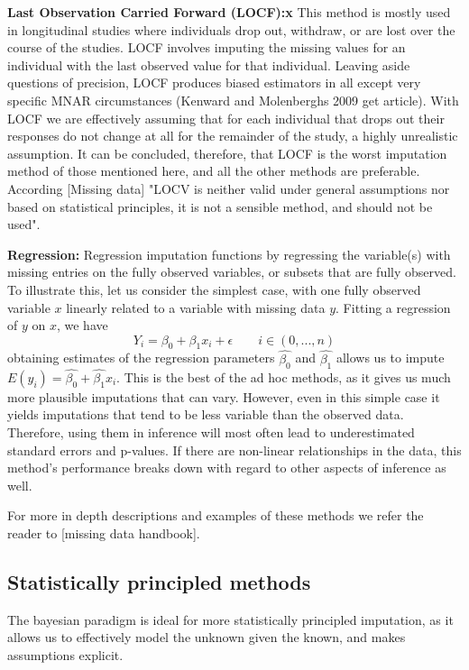 \documentclass{article}
\begin{document}
	
	\textbf{Last Observation Carried Forward (LOCF):x}
	This method is mostly used in longitudinal studies where individuals drop out, withdraw, or are lost over the course of the studies. LOCF involves imputing the missing values for an individual with the last observed value for that individual. Leaving aside questions of precision, LOCF produces biased estimators in all except very specific MNAR circumstances (Kenward and Molenberghs 2009 get article). With LOCF we are effectively assuming that for each individual that drops out their responses do not change at all for the remainder of the study, a highly unrealistic assumption. It can be concluded, therefore, that LOCF is the worst imputation method of those mentioned here, and all the other methods are preferable. According [Missing data] "LOCV is neither valid under general assumptions nor based on statistical principles, it is not a sensible method, and should not be used".
	
	\textbf{Regression:}
	Regression imputation functions by regressing the variable(s) with missing entries on the fully observed variables, or subsets that are fully observed. To illustrate this, let us consider the simplest case, with one fully observed variable $x$ linearly related to a variable with missing data $y$. Fitting a regression of $y$ on $x$, we have$$Y_{i} = \beta_{0} + \beta_{1}x_{i} + \epsilon \qquad i\in(0,...,n)$$ obtaining estimates of the regression parameters $\hat{\beta_{0}}$ and $\hat{\beta_{1}}$ allows us to impute $E(y_{i}) = \hat{\beta_{0}} + \hat{\beta_{1}}x_{i}$. This is the best of the ad hoc methods, as it gives us much more plausible imputations that can vary. However, even in this simple case it yields imputations that tend to be less variable than the observed data. Therefore, using them in inference will most often lead to underestimated standard errors and p-values. If there are non-linear relationships in the data, this method's performance breaks down with regard to other aspects of inference as well.
	
	For more in depth descriptions and examples of these methods we refer the reader to [missing data handbook].
	
	\subsection{Statistically principled methods}
	The bayesian paradigm is ideal for more statistically principled imputation, as it allows us to effectively model the unknown given the known, and makes assumptions explicit.
	
\end{document}
